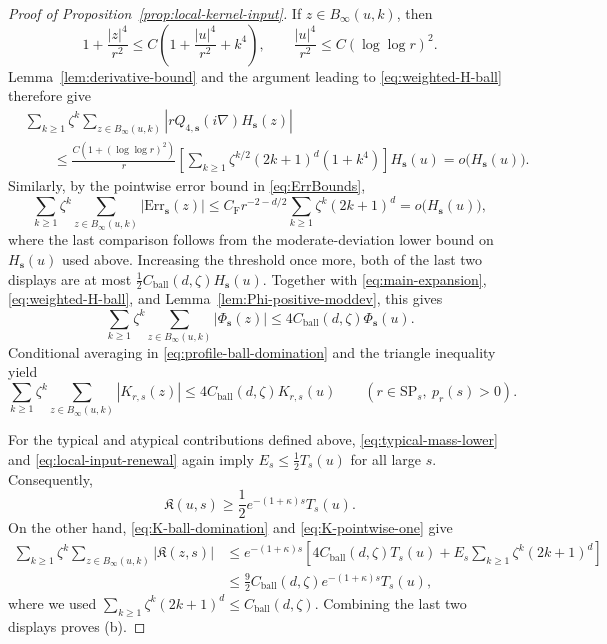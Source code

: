 \documentclass[letterpaper,11pt,reqno]{amsart}
\theoremstyle{definition}
\newcommand{\IK}{\mathfrak{K}}
\begin{document}
\begin{proof}[Proof of Proposition~\ref{prop:local-kernel-input}]
If \(z\in B_\infty(u,k)\), then
\[
1+\frac{|z|^4}{r^2}
\le
C\left(1+\frac{|u|^4}{r^2}+k^4\right),
\qquad
\frac{|u|^4}{r^2}\le C(\log\log r)^2.
\]
Lemma~\ref{lem:derivative-bound} and the argument leading to
\eqref{eq:weighted-H-ball} therefore give
\begin{align*}
&\sum_{k\ge1}\zeta^k
\sum_{z\in B_\infty(u,k)}
\left|rQ_{4,\mathbf s}(i\nabla)H_{\mathbf s}(z)\right|\\
&\qquad\le
\frac{C(1+(\log\log r)^2)}{r}
\left[
\sum_{k\ge1}\zeta^{k/2}(2k+1)^d(1+k^4)
\right]H_{\mathbf s}(u)
=o\bigl(H_{\mathbf s}(u)\bigr).
\end{align*}
Similarly, by the pointwise error bound in \eqref{eq:ErrBounds},
\[
\sum_{k\ge1}\zeta^k
\sum_{z\in B_\infty(u,k)}|\mathrm{Err}_{\mathbf s}(z)|
\le
C_{\mathrm F}r^{-2-d/2}
\sum_{k\ge1}\zeta^k(2k+1)^d
=o\bigl(H_{\mathbf s}(u)\bigr),
\]
where the last comparison follows from the moderate-deviation lower bound on
\(H_{\mathbf s}(u)\) used above. Increasing the threshold once more, both of the last two
displays are at most
\(\frac12C_{\mathrm{ball}}(d,\zeta)H_{\mathbf s}(u)\).
Together with \eqref{eq:main-expansion}, \eqref{eq:weighted-H-ball}, and
Lemma~\ref{lem:Phi-positive-moddev}, this gives
\begin{equation}\label{eq:profile-ball-domination}
\sum_{k\ge1}\zeta^k
\sum_{z\in B_\infty(u,k)}|\Phi_{\mathbf s}(z)|
\le
4C_{\mathrm{ball}}(d,\zeta)\Phi_{\mathbf s}(u).
\end{equation}
Conditional averaging in \eqref{eq:profile-ball-domination} and the triangle inequality yield
\begin{equation}\label{eq:K-ball-domination}
\sum_{k\ge1}\zeta^k
\sum_{z\in B_\infty(u,k)}|K_{r,s}(z)|
\le
4C_{\mathrm{ball}}(d,\zeta)K_{r,s}(u)
\qquad (r\in\mathrm{SP}_s,\ p_r(s)>0).
\end{equation}

For the typical and atypical contributions defined above,
\eqref{eq:typical-mass-lower} and \eqref{eq:local-input-renewal} again imply
\(E_s\le\frac12T_s(u)\) for all large \(s\). Consequently,
\[
\IK(u,s)\ge\frac12e^{-(1+\kappa)s}T_s(u).
\]
On the other hand, \eqref{eq:K-ball-domination} and \eqref{eq:K-pointwise-one} give
\begin{align*}
\sum_{k\ge1}\zeta^k
\sum_{z\in B_\infty(u,k)}|\IK(z,s)|
&\le
e^{-(1+\kappa)s}
\left[
4C_{\mathrm{ball}}(d,\zeta)T_s(u)
+E_s\sum_{k\ge1}\zeta^k(2k+1)^d
\right]\\
&\le
\frac92C_{\mathrm{ball}}(d,\zeta)e^{-(1+\kappa)s}T_s(u),
\end{align*}
where we used
\(\sum_{k\ge1}\zeta^k(2k+1)^d\le C_{\mathrm{ball}}(d,\zeta)\).
Combining the last two displays proves (b).


\end{proof}
\end{document}
